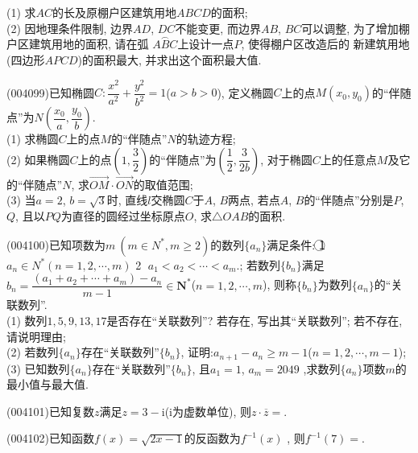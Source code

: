 \begin{center}
\end{center}
(1) 求$AC$的长及原棚户区建筑用地$ABCD$的面积;\\
(2) 因地理条件限制, 边界$AD$, $DC$不能变更, 而边界$AB$, $BC$可以调整, 为了增加棚户区建筑用地的面积, 请在弧 $\overset\frown{ABC}$上设计一点$P$, 使得棚户区改造后的
新建筑用地(四边形$APCD$)的面积最大, 并求出这个面积最大值.
\item (004099)已知椭圆$C:\dfrac{x^2}{a^2}+\dfrac{y^2}{b^2}=1$($a>b>0$), 定义椭圆$C$上的点$M(x_0,y_0)$的``伴随点''为$N(\dfrac{x_0}a,\dfrac{y_0}b)$.\\
(1) 求椭圆$C$上的点$M$的``伴随点''$N$的轨迹方程;\\
(2) 如果椭圆$C$上的点$(1,\dfrac 32)$的``伴随点''为$(\dfrac 12,\dfrac 3{2b})$, 对于椭圆$C$上的任意点$M$及它的``伴随点''$N$, 求$\overrightarrow{OM}\cdot \overrightarrow{ON}$的取值范围;\\
(3) 当$a=2$, $b=\sqrt 3$时, 直线$l$交椭圆$C$于$A$, $B$两点, 若点$A$, $B$的``伴随点''分别是$P$, $Q$, 且以$PQ$为直径的圆经过坐标原点$O$, 求$\triangle OAB$的面积.
\item (004100)已知项数为$m\ (m\in {N^*},m\ge 2)$的数列$\{ {a_n} \}$满足条件:
\textcircled{1}  $a_n\in {N^*}(n=1,2,\cdots ,m)$    \textcircled{2}  $a_1<a_2<\cdots <a_m$.;
若数列$\{b_n\}$满足 $b_n=\dfrac{(a_1+a_2+\cdots +a_m)-a_n}{m-1}\in \mathbf{N}^*$($n=1,2,\cdots ,m$), 则称$\{b_n\}$为数列$\{a_n\}$的``关联数列''.\\
(1) 数列$1, 5, 9, 13, 17$是否存在``关联数列''? 若存在, 写出其``关联数列''; 若不存在, 请说明理由;\\
(2) 若数列$\{a_n\}$存在``关联数列''$\{b_n\}$, 证明:$a_{n+1}-a_n\ge m-1$($n=1,2,\cdots ,m-1$);\\
(3) 已知数列$\{a_n\}$存在``关联数列''$\{b_n\}$, 且$a_1=1$, $a_m=2049$ ,求数列$\{a_n\}$项数$m$的最小值与最大值.
\item (004101)已知复数$z$满足$z=3-\mathrm{i}$($\mathrm{i}$为虚数单位), 则$z\cdot \overline z=$.
\item (004102)已知函数$f(x)=\sqrt{2x-1}$的反函数为$f^{-1}(x)$ , 则$f^{-1}(7)=$.
